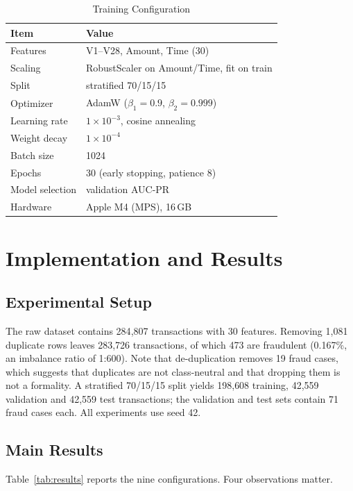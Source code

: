 \documentclass[conference]{IEEEtran}
\begin{document}
\begin{table}[t]
\caption{Training Configuration}
\label{tab:config}
\centering
\begin{tabular}{ll}
\toprule
Item & Value \\
\midrule
Features        & V1--V28, Amount, Time (30) \\
Scaling         & RobustScaler on Amount/Time, fit on train \\
Split           & stratified 70/15/15 \\
Optimizer       & AdamW ($\beta_1{=}0.9$, $\beta_2{=}0.999$) \\
Learning rate   & $1\times10^{-3}$, cosine annealing \\
Weight decay    & $1\times10^{-4}$ \\
Batch size      & 1024 \\
Epochs          & 30 (early stopping, patience 8) \\
Model selection & validation AUC-PR \\
Hardware        & Apple M4 (MPS), 16\,GB \\
\bottomrule
\end{tabular}
\end{table}

\section{Implementation and Results}
\label{sec:results}

\subsection{Experimental Setup}
The raw dataset contains 284{,}807 transactions with 30 features. Removing
1{,}081 duplicate rows leaves 283{,}726 transactions, of which 473 are
fraudulent (0.167\%, an imbalance ratio of 1:600). Note that de-duplication
removes 19 fraud cases, which suggests that duplicates are not class-neutral
and that dropping them is not a formality. A stratified 70/15/15 split yields
198{,}608 training, 42{,}559 validation and 42{,}559 test transactions; the
validation and test sets contain 71 fraud cases each. All experiments use
seed 42.

\subsection{Main Results}
Table~\ref{tab:results} reports the nine configurations. Four observations
matter.
\end{document}
